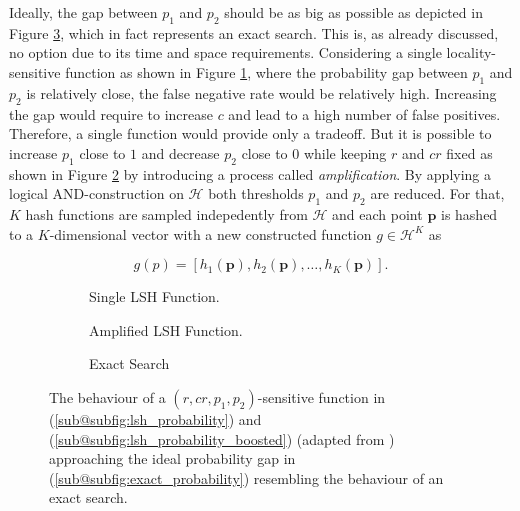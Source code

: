 \documentclass[../../../main.tex]{subfiles}
\begin{document}
Ideally, the gap between $p_1$ and $p_2$ should be as big as possible as depicted in Figure \ref{subfig:exact_probability}, which in fact represents an exact search. This is, as already discussed, no option due to its time and space requirements. Considering a single locality-sensitive function as shown in Figure \ref{subfig:lsh_probability}, where the probability gap between $p_1$ and $p_2$ is relatively close, the false negative rate would be relatively high. Increasing the gap would require to increase $c$ and lead to a high number of false positives. Therefore, a single function would provide only a tradeoff. But it is possible to increase $p_1$ close to $1$ and decrease $p_2$ close to $0$ while keeping $r$ and $cr$ fixed as shown in Figure \ref{subfig:lsh_probability_boosted} by introducing a process called \textit{amplification}. By applying a logical AND-construction on $\mathcal{H}$ both thresholds $p_1$ and $p_2$ are reduced. For that, $K$ hash functions are sampled indepedently from $\mathcal{H}$ and each point $\bm{p}$ is hashed to a $K$-dimensional vector with a new constructed function $g \in \mathcal{H}^K$ as

\begin{equation}\label{eq:or_construction}
    g(p) = [h_1(\bm{p}), h_2(\bm{p}), \dots, h_K(\bm{p})].
\end{equation}

\begin{figure}
    \centering
    \begin{subfigure}[b]{0.3\textwidth}
        \centering
        
        \caption{Single LSH Function.}
        \label{subfig:lsh_probability}
    \end{subfigure}
    \hfill
    \begin{subfigure}[b]{0.3\textwidth}
        \centering
        
        \caption{Amplified LSH Function.}
        \label{subfig:lsh_probability_boosted}
        \end{subfigure}
        \hfill
        \begin{subfigure}[b]{0.3\textwidth}
            \centering
            
            \caption{Exact Search}
            \label{subfig:exact_probability}
    \end{subfigure}
    \caption[The behaviour of a $(r, cr, p_1, p_2)$-sensitive function]{The behaviour of a $(r, cr, p_1, p_2)$-sensitive function in (\ref{sub@subfig:lsh_probability}) and (\ref{sub@subfig:lsh_probability_boosted}) (adapted from \cite[100]{leskovec_rajaraman_ullman_2014}) approaching the ideal probability gap in (\ref{sub@subfig:exact_probability}) resembling the behaviour of an exact search.}
    \label{fig:lsh_probability}
\end{figure}
   
\end{document}
